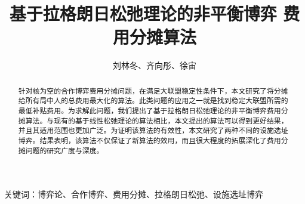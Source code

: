 \documentclass[UTF8]{article}
\author {刘林冬、齐向彤、徐宙}
\title {基于拉格朗日松弛理论的非平衡博弈
费用分摊算法}
\date{}
\begin{document}
    \maketitle
\begin{abstract}
针对核为空的合作博弈费用分摊问题，在满足大联盟稳定性条件下，本文研究了将分摊给所有局中人的总费用最大化的算法。此类问题的应用之一就是找到稳定大联盟所需的最低补贴费用。为求解此问题，我们提出了基于拉格朗日松弛理论的非平衡博弈费用分摊算法。与现有的基于线性松弛理论的算法相比，本文提出的算法可以得到更好结果，并且其适用范围也更加广泛。为证明该算法的有效性，本文研究了两种不同的设施选址博弈。结果表明，该算法不仅保证了新算法的效用，而且很大程度的拓展深化了费用分摊问题的研究广度与深度。

\end{abstract}

\begin{keywords}
关键词：博弈论、合作博弈、费用分摊、拉格朗日松弛、设施选址博弈
\end{keywords}
\end{document}
